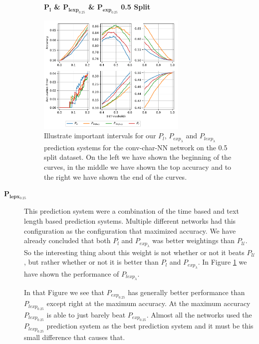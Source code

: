 \begin{description}
        \begin{figure}
            \centering
            \textbf{$\mathbf{P_l}$ \& $\mathbf{P_{lexp_{0.25}}}$ \&
            $\mathbf{P_{exp_{0.25}}}$ 0.5 Split}\par\medskip
            \includegraphics[width=0.7\textwidth]{./pictures/discussion/conv_char_nn_prediction_zoom_length}
            \caption{Illustrate important intervals for our $P_l$,
                $P_{exp_\lambda}$ and $P_{lexp_{\lambda}}$ prediction systems
                for the \gls{conv-char-NN} network on the 0.5 split dataset. On
                the left we have shown the beginning of the curves, in the
                middle we have shown the top accuracy and to the right we have
                shown the end of the curves.}
            \label{fig:conv_char_prediction_zoom_50_text_length}
        \end{figure}

    \item[$\mathbf{P_{lepx_{0.25}}}$]

        This prediction system were a combination of the time based and text
        length based prediction systems. Multiple different networks had this
        configuration as the configuration that maximized accuracy. We have
        already concluded that both $P_l$ and $P_{exp_\lambda}$ was better
        weightings than $P_\mathcal{U}$. So the interesting thing about this
        weight is not whether or not it beats $P_\mathcal{U}$, but rather
        whether or not it is better than $P_l$ and $P_{exp_\lambda}$. In Figure
        \ref{fig:conv_char_prediction_zoom_50_text_length} we have shown the
        performance of $P_{lexp_\lambda}$.

        In that Figure we see that $P_{exp_{0.25}}$ has generally better
        performance than $P_{lexp_{0.25}}$ except right at the maximum accuracy.
        At the maximum accuracy $P_{lexp_{0.25}}$ is able to just barely beat
        $P_{exp_{0.25}}$. Almost all the networks used the $P_{lexp_{0.25}}$
        prediction system as the best prediction system and it must be this
        small difference that causes that.


\end{description}
